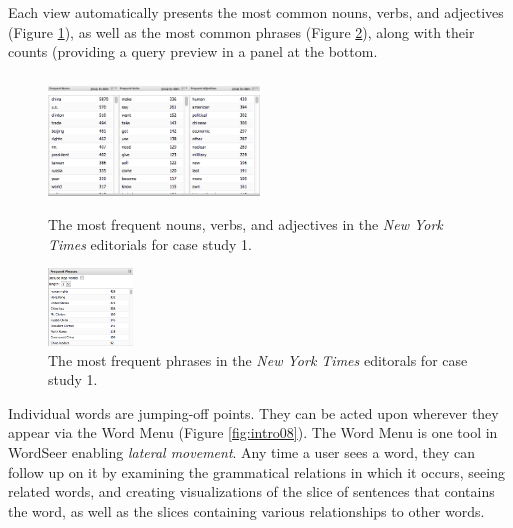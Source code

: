 \documentclass{sig-alternate}
\begin{document}
Each view automatically presents the most common nouns, verbs, and adjectives (Figure \ref{fig:intro06}), as well as the most common phrases (Figure \ref{fig:intro07}), along with their counts (providing a query preview \cite{donn_query_1996} in a panel at the bottom.    
\begin{figure}[ht!]
\begin{center}
	\includegraphics[width=0.5\textwidth]{fig/intro/06a.png}
	\includegraphics[width=0.5\textwidth]{fig/intro/06.png}
\end{center}
    \caption{%
       The most frequent nouns, verbs, and adjectives in the \emph{New York Times} editorials for case study 1.  \label{fig:intro06}
     }%
\end{figure}

\begin{figure}[ht!]
\begin{center}
	\includegraphics[width=0.2\textwidth]{fig/intro/07.png}
\end{center}
    \caption{%
       The most frequent phrases in the \emph{New York Times} editorals for case study 1. \label{fig:intro07}
     }%
\end{figure}

Individual words are jumping-off points. They can be acted upon wherever they appear via the Word Menu (Figure \ref{fig:intro08}). The Word Menu is one tool in  WordSeer enabling \emph{lateral movement}.  Any time a user sees a word, they can follow up on it by examining the grammatical relations in which it occurs, seeing related words,  and creating visualizations of the slice of sentences that contains the word, as well as the slices containing various relationships to other words.
\end{document}
